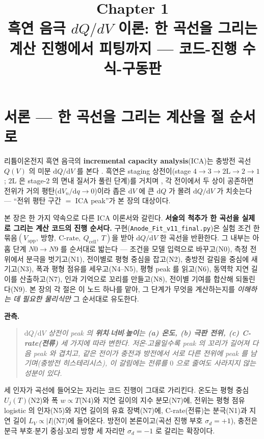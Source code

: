 \documentclass[11pt,a4paper]{article}
\title{\textbf{\LARGE Chapter 1}\\[0.35em]\Large 흑연 음극 $dQ/dV$ 이론: 한 곡선을 그리는 계산 진행에서 피팅까지 — 코드-진행 수식-구동판}
\author{}
\date{}
\newcommand{\dd}{\mathrm{d}}
\newcommand{\app}{\mathrm{app}}
\newcommand{\cell}{\mathrm{cell}}
\newcommand{\code}[1]{\texttt{#1}}
\begin{document}
\maketitle

\section*{서론 — 한 곡선을 그리는 계산을 절 순서로}
리튬이온전지 흑연 음극의 \textbf{incremental capacity analysis}(ICA)는 충방전 곡선 $Q(V)$ 의 미분
$\dd Q/\dd V$ 를 본다 \cite{bloom2005,dubarry2012}. 흑연은 staging 상전이(stage
$4\!\to\!3\!\to\!2\mathrm L\!\to\!2\!\to\!1$; $2\mathrm L$ 은 stage-2 의 면내 질서가 풀린 단계)를 거치며
\cite{dahn1991,ohzuku1993,funabiki1999}, 각 전이에서 두 상이 공존하면 전위가 거의 평탄($\dd V_n/\dd q\to0$)이라
좁은 $\dd V$ 에 큰 $\dd Q$ 가 몰려 $\dd Q/\dd V$ 가 치솟는다 — ``전위 평탄 구간 $=$ ICA peak''가 본 장의 대상이다.

본 장은 한 가지 약속으로 다른 ICA 이론서와 갈린다. \textbf{서술의 척추가 한 곡선을 실제로 그리는 계산 코드의 진행 순서다.} 구현(\code{Anode\_Fit\_v11\_final.py})은 실험 조건 한 묶음$(V_\app,\ \text{방향},\ \text{C-rate},\ Q_\cell,\ T)$을 받아 $\dd Q/\dd V$ 한 곡선을 반환한다. 그 내부는 아홉 단계 $N0\!\to\!N9$ 를 순서대로 밟는다 — 조건을 모델 입력으로 바꾸고(N0), 측정 전위에서 분극을 벗기고(N1), 전이별로 평형 중심을 잡고(N2), 충방전 갈림을 중심에 새기고(N3), 폭과 평형 점유를 세우고(N4--N5), 평형 peak 를 읽고(N6), 동역학 지연 길이를 산출하고(N7), 인과 기억으로 꼬리를 만들고(N8), 전이별 기여를 합산해 되돌린다(N9). 본 장의 각 절은 이 노드 하나를 맡아, 그 단계가 무엇을 계산하는지를 \emph{이해하는 데 필요한 물리식만} 그 순서대로 유도한다.

\textbf{관측.}
\begin{quote}\itshape
$\dd Q/\dd V$ 상전이 peak 의 \textbf{위치$\cdot$너비$\cdot$높이}는 \textbf{(a) 온도, (b) 극판 전위, (c) C-rate(전류)}
세 가지에 따라 변한다. 저온$\cdot$고율일수록 peak 의 꼬리가 길어져 다음 peak 와 겹치고, 같은 전이가 충전과 방전에서 서로 다른
전위에 peak 를 남기며(충방전 히스테리시스), 이 갈림에는 전류를 $0$ 으로 줄여도 사라지지 않는 성분이 있다.
\end{quote}

세 인자가 곡선에 들어오는 자리는 코드 진행이 그대로 가리킨다. 온도는 평형 중심 $U_j(T)$(N2)와 폭 $w\propto T$(N4)와 지연 길이의 지수 분모(N7)에, 전위는 평형 점유 logistic 의 인자(N5)와 지연 길이의 유효 장벽(N7)에, C-rate(전류)는 분극(N1)과 지연 길이 $L_V\propto|I|$(N7)에 들어온다. 방전이 본론이고(곡선 진행 부호 $\sigma_d=+1$), 충전은 분극 부호$\cdot$분기 중심$\cdot$꼬리 방향 세 자리만 $\sigma_d=-1$ 로 갈리는 확장이다.
\end{document}
